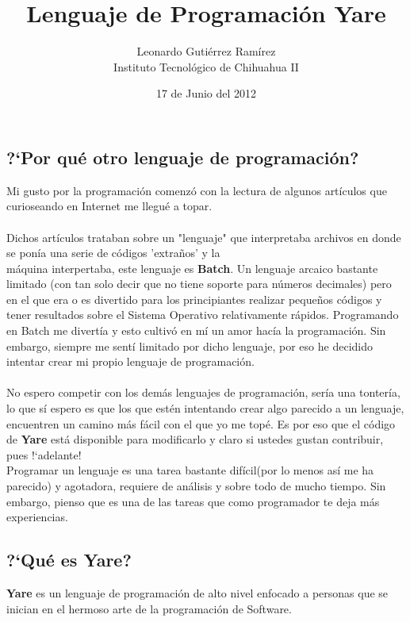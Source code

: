 \documentclass{book}
\title{Lenguaje de Programaci\'on Yare}
\author{Leonardo Guti\'errez Ram\'irez\\Instituto Tecnológico de Chihuahua II}
\date{17 de Junio del 2012}
\begin{document}

\maketitle

\subsection{?`Por qu\'e otro lenguaje de programaci\'on?}

Mi gusto por la programaci\'on comenz\'o con la lectura de algunos art\'iculos que curioseando en Internet me llegu\'e a topar.\\
\\Dichos art\'iculos trataban sobre un "lenguaje" que interpretaba archivos en donde se pon\'ia una serie de c\'odigos 'extra\~nos'  y la\\
m\'aquina interpertaba, este lenguaje es {\bf Batch}. Un lenguaje arcaico bastante limitado (con tan solo decir que no tiene soporte para 
n\'umeros decimales) pero en el que era o es divertido para los principiantes realizar peque\~nos c\'odigos y tener resultados sobre el Sistema Operativo
relativamente r\'apidos. Programando en Batch me divert\'ia y esto cultiv\'o en m\'i un amor hac\'ia la programaci\'on. Sin embargo, siempre
me sent\'i limitado por dicho lenguaje, por eso he decidido intentar crear mi propio lenguaje de programaci\'on.\\\\


No espero competir con los dem\'as lenguajes de programaci\'on, ser\'ia una tonter\'ia, lo que s\'i espero es que los que est\'en intentando
crear algo parecido a un lenguaje, encuentren un camino m\'as f\'acil con el que yo me top\'e. Es por eso que el c\'odigo de {\bf Yare} est\'a
disponible para modificarlo y claro si ustedes gustan contribuir, pues !`adelante!\\

Programar un lenguaje es una tarea bastante dif\'icil(por lo menos as\'i me ha parecido) y agotadora, requiere de an\'alisis y sobre todo de 
mucho tiempo. Sin embargo, pienso que es una de las tareas que como programador te deja m\'as experiencias.

\subsection{?`Qu\'e es Yare?}

{\bf Yare} es un lenguaje de programaci\'on de alto nivel enfocado a personas que se inician en el hermoso arte de la programaci\'on de 
Software.
\end{document}

